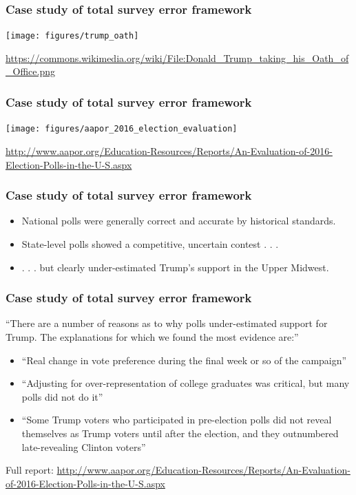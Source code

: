 \documentclass[aspectratio=169]{beamer}
\begin{document}
\begin{frame}
\frametitle{Case study of total survey error framework}

\begin{center}
\texttt{[image: figures/trump\_oath]}
\end{center}

\vfill
\tiny{\textcolor{blue}{\url{https://commons.wikimedia.org/wiki/File:Donald_Trump_taking_his_Oath_of_Office.png}}}

\end{frame}
\begin{frame}
\frametitle{Case study of total survey error framework}

\begin{center}
\texttt{[image: figures/aapor\_2016\_election\_evaluation]}
\end{center}

\vfill
\tiny{\url{http://www.aapor.org/Education-Resources/Reports/An-Evaluation-of-2016-Election-Polls-in-the-U-S.aspx}}

\end{frame}
\begin{frame}
\frametitle{Case study of total survey error framework}

\begin{itemize}
\item National polls were generally correct and accurate by historical standards.
\pause
\item State-level polls showed a competitive, uncertain contest  . . . 
\pause
\item  . . . but clearly under-estimated Trump's support in the Upper Midwest.
\end{itemize}

\end{frame}
\begin{frame}
\frametitle{Case study of total survey error framework}

``There are a number of reasons as to why polls under-estimated support for Trump. The explanations for which we found the most evidence are:''
\begin{itemize}
\item ``Real change in vote preference during the final week or so of the campaign''
\pause
\item ``Adjusting for over-representation of college graduates was critical, but many polls did not do it''
\pause
\item ``Some Trump voters who participated in pre-election polls did not reveal themselves as Trump voters until after the election, and they outnumbered late-revealing Clinton voters''
\end{itemize}

\vfill

Full report: \url{http://www.aapor.org/Education-Resources/Reports/An-Evaluation-of-2016-Election-Polls-in-the-U-S.aspx}

\end{frame}
\end{document}
